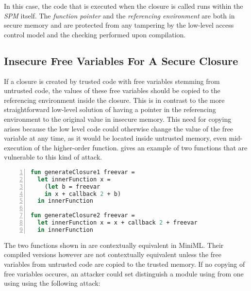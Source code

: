 In this case, the code that is executed when the closure is called runs within the \emph{SPM} itself.
The \emph{function pointer} and the \emph{referencing environment} are both in secure memory and are protected from any tampering by the low-level access control model and the checking performed upon compilation.

\subsection{Insecure Free Variables For A Secure Closure}
If a closure is created by trusted code with free variables stemming from untrusted code, the values of these free variables should be copied to the referencing environment inside the closure. This is in contrast to the more straightforward low-level solution of having a pointer in the referencing environment to the original value in insecure memory.
This need for copying arises because the low level code could otherwise change the value of the free variable at any time, as it would be located inside untrusted memory, even mid-execution of the higher-order function.
 gives an example of two functions that are vulnerable to this kind of attack.

\begin{lstlisting}[frame=single, language=ML,caption=Changing free variables inside untrusted memory mid-execution can break contextual equivalence., label=code:CopyFreeVariables,numbers=left]
fun generateClosure1 freevar =
  let innerFunction x =
    (let b = freevar
    in x + callback 2 + b)
  in innerFunction

fun generateClosure2 freevar = 
  let innerFunction x = x + callback 2 + freevar
  in innerFunction
\end{lstlisting}
\label{code:CopyFreeVariables}

The two functions shown in  are contextually equivalent in \mbox{MiniML}.
Their compiled versions however are not contextually equivalent unless the free variables from untrusted code are copied to the trusted memory.
If no copying of free variables occures, an attacker could set distinguish a module using  from one using  using the following attack:


